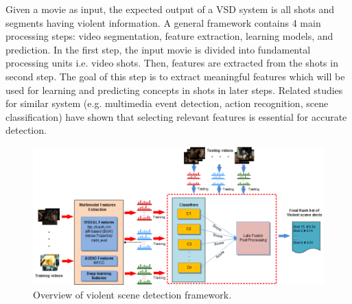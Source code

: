 \documentclass[twocolumn]{bmcart}%
\begin{document}
Given a movie as input, the expected output of a VSD system is all shots and segments having violent information. A general framework \cite{demarty2014benchmarking,myers2014evaluating,oh2014multimedia}contains 4 main processing steps: video segmentation, feature extraction, learning models, and prediction. In the first step, the input movie is divided into fundamental processing units i.e. video shots. Then, features are extracted from the shots in second step. The goal of this step is to extract meaningful features which will be used for learning and predicting concepts in shots in later steps. Related studies for similar system (e.g. multimedia event detection, action recognition, scene classification) have shown that selecting relevant features is essential for accurate detection.
\begin{figure}
	\centering
	\includegraphics[width=2\linewidth]{Images/Framework1.png}
	\caption{Overview of violent scene detection framework.}
	\label{fig:framework}
\end{figure}
\end{document}
